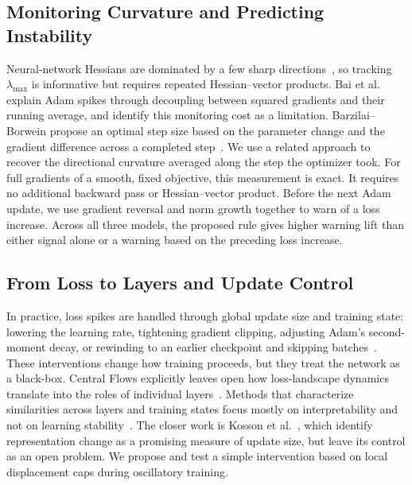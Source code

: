 \subsection{Monitoring Curvature and Predicting Instability}

Neural-network Hessians are dominated by a few sharp directions~\cite{sagun2017hessian,ghorbani2019density}, so tracking $\lambda_{\max}$ is informative but requires repeated Hessian--vector products. Bai et al.~\cite{bai2026spikes} explain Adam spikes through decoupling between squared gradients and their running average, and identify this monitoring cost as a limitation. Barzilai--Borwein propose an optimal step size based on the parameter change and the gradient difference across a completed step~\cite{barzilai1988two,tan2016bbsgd}. We use a related approach to recover the directional curvature averaged along the step the optimizer took. For full gradients of a smooth, fixed objective, this measurement is exact. It requires no additional backward pass or Hessian--vector product. Before the next Adam update, we use gradient reversal and norm growth together to warn of a loss increase. Across all three models, the proposed rule gives higher warning lift than either signal alone or a warning based on the preceding loss increase.

\subsection{From Loss to Layers and Update Control}

In practice, loss spikes are handled through global update size and training state: lowering the learning rate, tightening gradient clipping, adjusting Adam's second-moment decay, or rewinding to an earlier checkpoint and skipping batches~\cite{chowdhery2022palm,zhang2022opt,bai2026spikes}. These interventions change how training proceeds, but they treat the network as a black-box. Central Flows explicitly leaves open how loss-landscape dynamics translate into the roles of individual layers~\cite{cohen2025central}. Methods that characterize similarities across layers and training states focus mostly on interpretability and not on learning stability~\cite{raghu2017svcca,kornblith2019similarity}. The closer work is Kosson et al.~\cite{kosson2024warmup}, which identify representation change as a promising measure of update size, but leave its control as an open problem. We propose and test a simple intervention based on local displacement caps during oscillatory training.
